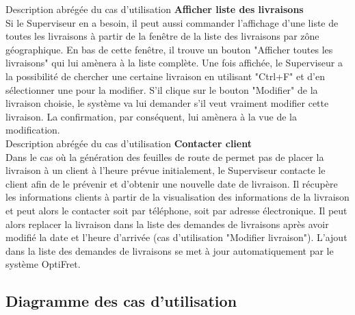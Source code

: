 \documentclass[a4paper]{report}
\begin{document}
Description abrégée du cas d'utilisation \textbf{Afficher liste des
    livraisons}\\

Si le Superviseur en a besoin, il peut aussi commander l'affichage d'une liste
de toutes les livraisons à partir de la fenêtre de la liste des livraisons par
zône géographique. En bas de cette fenêtre, il trouve un bouton "Afficher
toutes les livraisons" qui lui amènera à la liste complète. Une fois affichée,
le Superviseur a la possibilité de chercher une certaine livraison en utilisant
"Ctrl+F" et d'en sélectionner une pour la modifier. S'il clique sur le bouton
"Modifier" de la livraison choisie, le système va lui demander s'il veut
vraiment modifier cette livraison. La confirmation, par conséquent, lui amènera
à la vue de la modification.\\

Description abrégée du cas d'utilisation \textbf{Contacter client}\\

Dans le cas où la génération des feuilles de route de permet pas de placer la
livraison à un client à l'heure prévue initialement, le Superviseur contacte le
client afin de le prévenir et d'obtenir une nouvelle date de livraison. Il
récupère les informations clients à partir de la visualisation des informations
de la livraison et peut alors le contacter soit par téléphone, soit par adresse
électronique. Il peut alors replacer la livraison dans la liste des demandes de
livraisons après avoir modifié la date et l'heure d'arrivée (cas d'utilisation
"Modifier livraison"). L'ajout dans la liste des demandes de livraisons se met
à jour automatiquement par le système OptiFret.\\

\subsection{Diagramme des cas d'utilisation}
\end{document}
